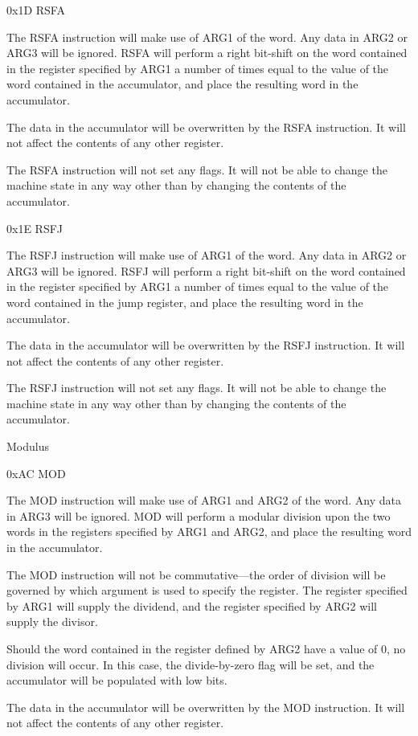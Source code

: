 \documentclass[]{article}
\begin{document}
0x1D RSFA

The RSFA instruction will make use of ARG1 of the word. Any data in ARG2
or ARG3 will be ignored. RSFA will perform a right bit-shift on the word
contained in the register specified by ARG1 a number of times equal to
the value of the word contained in the accumulator, and place the
resulting word in the accumulator.

The data in the accumulator will be overwritten by the RSFA instruction.
It will not affect the contents of any other register.

The RSFA instruction will not set any flags. It will not be able to
change the machine state in any way other than by changing the contents
of the accumulator.

0x1E RSFJ

The RSFJ instruction will make use of ARG1 of the word. Any data in ARG2
or ARG3 will be ignored. RSFJ will perform a right bit-shift on the word
contained in the register specified by ARG1 a number of times equal to
the value of the word contained in the jump register, and place the
resulting word in the accumulator.

The data in the accumulator will be overwritten by the RSFJ instruction.
It will not affect the contents of any other register.

The RSFJ instruction will not set any flags. It will not be able to
change the machine state in any way other than by changing the contents
of the accumulator.

Modulus

0xAC MOD

The MOD instruction will make use of ARG1 and ARG2 of the word. Any data
in ARG3 will be ignored. MOD will perform a modular division upon the
two words in the registers specified by ARG1 and ARG2, and place the
resulting word in the accumulator.

The MOD instruction will not be commutative---the order of division will
be governed by which argument is used to specify the register. The
register specified by ARG1 will supply the dividend, and the register
specified by ARG2 will supply the divisor.

Should the word contained in the register defined by ARG2 have a value
of 0, no division will occur. In this case, the divide-by-zero flag will
be set, and the accumulator will be populated with low bits.~

The data in the accumulator will be overwritten by the MOD instruction.
It will not affect the contents of any other register.
\end{document}
